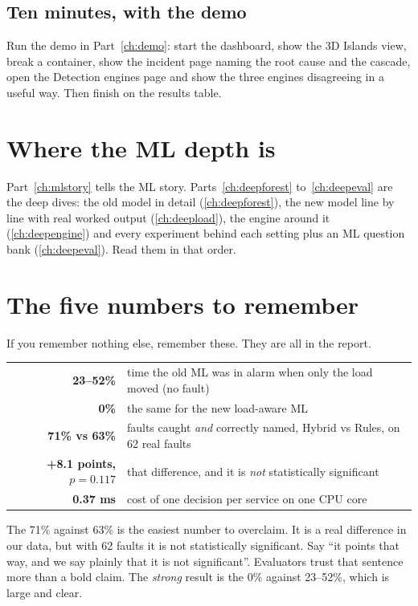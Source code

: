 \subsection{Ten minutes, with the demo}
Run the demo in Part~\ref{ch:demo}: start the dashboard, show the 3D Islands view, break a container, show the incident page naming the root cause and the cascade, open the Detection engines page and show the three engines disagreeing in a useful way. Then finish on the results table.

\section{Where the ML depth is}
Part~\ref{ch:mlstory} tells the ML story. Parts~\ref{ch:deepforest} to~\ref{ch:deepeval} are the deep dives: the old model in detail (\ref{ch:deepforest}), the new model line by line with real worked output (\ref{ch:deepload}), the engine around it (\ref{ch:deepengine}) and every experiment behind each setting plus an ML question bank (\ref{ch:deepeval}). Read them in that order.

\section{The five numbers to remember}
If you remember nothing else, remember these. They are all in the report.

\begin{center}
\begin{tabular}{@{}rl@{}}
\toprule
\textbf{23--52\%} & time the old ML was in alarm when only the load moved (no fault)\\
\textbf{0\%} & the same for the new load-aware ML\\
\textbf{71\% vs 63\%} & faults caught \emph{and} correctly named, Hybrid vs Rules, on 62 real faults\\
\textbf{+8.1 points, $p=0.117$} & that difference, and it is \emph{not} statistically significant\\
\textbf{0.37 ms} & cost of one decision per service on one CPU core\\
\bottomrule
\end{tabular}
\end{center}

\begin{warnbox}
The 71\% against 63\% is the easiest number to overclaim. It is a real difference in our data, but with 62 faults it is not statistically significant. Say ``it points that way, and we say plainly that it is not significant''. Evaluators trust that sentence more than a bold claim. The \emph{strong} result is the 0\% against 23--52\%, which is large and clear.
\end{warnbox}
